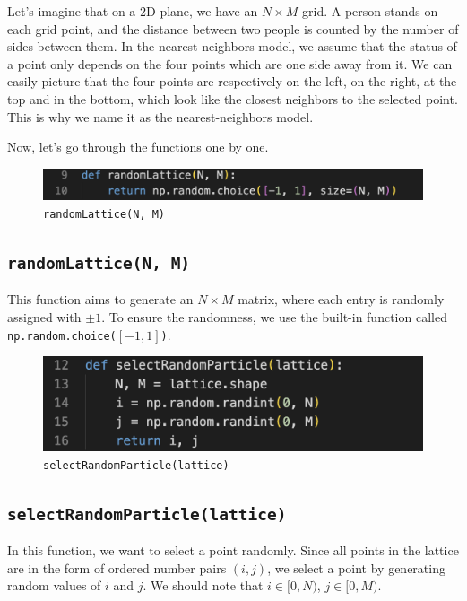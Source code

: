 \documentclass[11pt]{book}
\begin{document}
Let's imagine that on a 2D plane, we have an $N \times M$ grid. A person stands on each grid point, and the distance between two people is counted by the number of sides between them. In the nearest-neighbors model, we assume that the status of a point only depends on the four points which are one side away from it. We can easily picture that the four points are respectively on the left, on the right, at the top and in the bottom, which look like the closest neighbors to the selected point. This is why we name it as the nearest-neighbors model.

Now, let's go through the functions one by one.

\begin{figure}
    \centering
    \includegraphics[width=1\linewidth]{nn_randomLattice.png}
    \caption{\texttt{randomLattice(N, M)}}
    \label{fig40}
\end{figure}

\subsection{\texttt{randomLattice(N, M)}}

This function aims to generate an $N \times M$ matrix, where each entry is randomly assigned with $\pm 1$. To ensure the randomness, we use the built-in function called \texttt{np.random.choice($[-1, 1]$)}.

\begin{figure}
    \centering
    \includegraphics[width=1\linewidth]{nn_selectRandomParticle.png}
    \caption{\texttt{selectRandomParticle(lattice)}}
    \label{fig41}
\end{figure}

\subsection{\texttt{selectRandomParticle(lattice)}}

In this function, we want to select a point randomly. Since all points in the lattice are in the form of ordered number pairs $(i, j)$, we select a point by generating random values of $i$ and $j$. We should note that $i \in [0, N)$,  $j \in [0, M)$.
\end{document}
